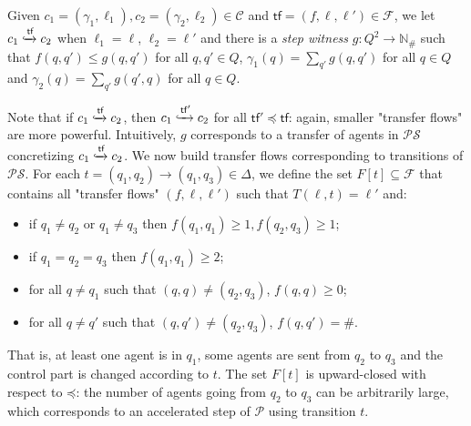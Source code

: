 \documentclass[10pt,a4paper]{article}
\let\mathbb\mathds
\renewcommand{\geq}{\geqslant}
\renewcommand{\leq}{\leqslant}
\newcommand{\nats}{\mathbb{N}}
\newcommand{\prot}{\mathcal{P}}
\newcommand{\config}{\gamma}
\newcommand{\transitions}{\Delta}
\newcommand*{\states}{Q}
\newcommand*{\atrans}{t}
\newcommand{\trans}[1]{\xrightarrow{#1}}       %
\newcommand{\btransitions}{T}
\newcommand*{\abuchistate}{\ell}
\newcommand*{\bstate}{\abuchistate}
\newcommand{\prodsystem}{\mathcal{PS}}
\newcommand{\prodconfigs}{\mathcal{C}}
\newcommand{\prodconfig}{c}
\newcommand*{\dummysymb}{\#}
\newcommand*{\natsanddummy}{\nats_{\dummysymb}}
\newcommand*{\transferflows}{\mathcal{F}}
\newcommand*{\transfersof}[1]{F[#1]}
\newcommand*{\atf}{\mathsf{tf}}
\newcommand*{\flowstep}[1]{\xhookrightarrow{#1}}
\newcommand*{\letf}{\preceq}
\begin{document}
\begin{definition}
	Given \(\prodconfig_1 = (\config_1, \bstate_1), \prodconfig_2 = (\config_2, \bstate_2)\in \prodconfigs\) and \(\atf = (f,\bstate,\bstate') \in \transferflows\), we let \(\prodconfig_1 \flowstep{\atf} \prodconfig_2\) when \(\bstate_1 = \bstate\), \(\bstate_2 = \bstate'\) and there is a \emph{step witness} \(g: \states^2 \to \natsanddummy\) such that \(f(q,q') \leq g(q,q')\) for all \(q,q'\in\states\), \( \config_1(q) = \sum_{q'} g(q,q')\) for all \(q\in\states\) and \( \config_2(q) = \sum_{q'} g(q',q)\) for all \(q\in\states\).
\end{definition}
%
%
Note that if \(\prodconfig_1 \flowstep{\atf} \prodconfig_2\), then \(\prodconfig_1 \flowstep{\atf'} \prodconfig_2\) for all \(\atf' \letf \atf\): again, smaller "transfer flows" are more powerful.
%
Intuitively, \(g\) corresponds to a transfer of agents in \(\prodsystem\) concretizing \(\prodconfig_1 \flowstep{\atf} \prodconfig_2\).
%
We now build transfer flows corresponding to transitions of \(\prodsystem\).
%
For each \(\atrans = (q_1, q_2) \trans{} (q_1, q_3) \in \transitions\), we define the set \(\transfersof{\atrans} \subseteq \transferflows\) that contains all "transfer flows" \((f,\bstate, \bstate')\) such that \(\btransitions(\bstate, \atrans) = \bstate'\) and:
\begin{itemize}[noitemsep,topsep=0pt,parsep=0pt,partopsep=0pt]
	\item if \(q_1 \ne q_2\) or \(q_1 \ne q_3\) then \(f(q_1,q_1) \geq 1, f(q_2,q_3) \geq 1\);
	\item if \(q_1 = q_2 = q_3\) then \(f(q_1,q_1) \geq 2\);
	\item for all \(q \ne q_1\) such that \((q,q) \ne (q_2,q_3)\), \(f(q,q) \geq 0\);
	\item for all \(q\ne q'\) such that \((q,q') \ne (q_2,q_3)\), \(f(q,q') = \dummysymb\).
\end{itemize}
%
That is, at least one agent is in \(q_1\), some agents are sent from \(q_2\) to \(q_3\) and the control part is changed according to \(t\).
The set \(\transfersof{\atrans}\) is upward-closed with respect to \(\mathord{\letf}\): the number of agents going from \(q_2\) to \(q_3\) can be arbitrarily large, which corresponds to an accelerated step of \(\prot\) using transition \(t\).
\end{document}
